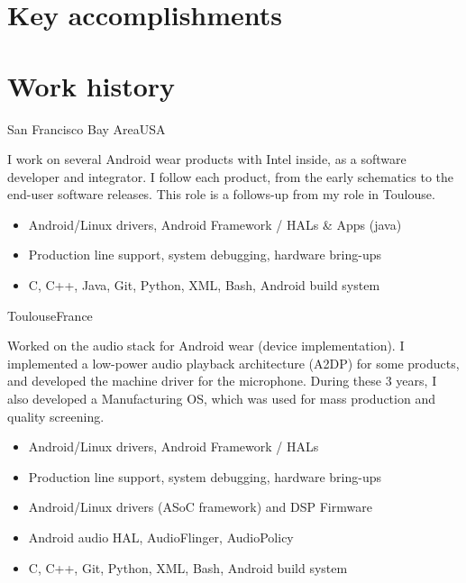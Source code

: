 \documentclass[a4paper,11pt,sans]{moderncv}
\begin{document}
\section{Key accomplishments}
\begin{cvcolumns}
\end{cvcolumns}
\begin{cvcolumns}
\end{cvcolumns}


\section{Work history}
{San Francisco Bay Area}{USA}
{
  I work on several Android wear products with Intel inside, as a software developer and integrator.
  I follow each product, from the early schematics to the end-user software releases.
  This role is a follows-up from my role in Toulouse.
    \begin{itemize}
        \item Android/Linux drivers, Android Framework / HALs \& Apps (java)
        \item Production line support, system debugging, hardware bring-ups
        \item C, C++, Java, Git, Python, XML, Bash, Android build system
    \end{itemize}
}

{Toulouse}{France}
{
  Worked on the audio stack for Android wear (device implementation). I implemented a low-power audio playback architecture (A2DP) for some products, and developed the machine driver for the microphone.
  During these 3 years, I also developed a Manufacturing OS, which was used for mass production and quality screening.
    \begin{itemize}
        \item Android/Linux drivers, Android Framework / HALs
        \item Production line support, system debugging, hardware bring-ups
        \item Android/Linux drivers (ASoC framework) and DSP Firmware
        \item Android audio HAL, AudioFlinger, AudioPolicy
        \item C, C++, Git, Python, XML, Bash, Android build system
    \end{itemize}
}
\end{document}
